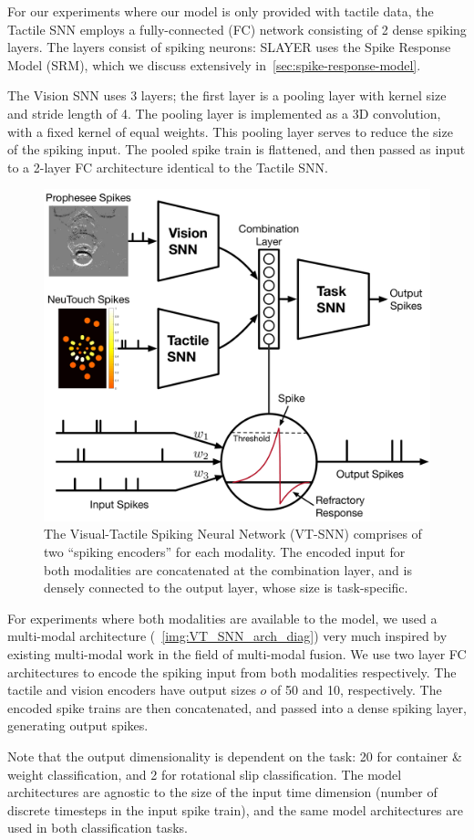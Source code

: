 \documentclass[fyp]{socreport}
\begin{document}
For our experiments where our model is only provided with tactile data, the
Tactile SNN employs a fully-connected (FC) network consisting of 2 dense spiking
layers. The layers consist of spiking neurons: SLAYER uses the Spike Response
Model (SRM), which we discuss extensively in~\autoref{sec:spike-response-model}.

The Vision SNN uses 3 layers; the first layer is a pooling layer with kernel
size and stride length of 4. The pooling layer is implemented as a 3D
convolution, with a fixed kernel of equal weights. This pooling layer serves to
reduce the size of the spiking input. The pooled spike train is flattened, and
then passed as input to a 2-layer FC architecture identical to the Tactile SNN.

\begin{figure}
  \centering
  \includegraphics[width=0.45\columnwidth]{images/VT-SNN_v3.pdf}
  \caption{The Visual-Tactile Spiking Neural Network (VT-SNN) comprises of two
    ``spiking encoders'' for each modality. The encoded input for both
    modalities are concatenated at the combination layer, and is densely
    connected to the output layer, whose size is
    task-specific.\label{img:VT_SNN_arch_diag}}
\end{figure}

For experiments where both modalities are available to the model, we used a
multi-modal architecture (~\autoref{img:VT_SNN_arch_diag}) very much inspired by
existing multi-modal work in the field of multi-modal fusion. We use two layer
FC architectures to encode the spiking input from both modalities respectively.
The tactile and vision encoders have output sizes $o$ of 50 and 10,
respectively. The encoded spike trains are then concatenated, and passed into a
dense spiking layer, generating output spikes.

Note that the output dimensionality is dependent on the task: 20 for container \&
weight classification, and 2 for rotational slip classification. The model
architectures are agnostic to the size of the input time dimension (number of
discrete timesteps in the input spike train), and the same model architectures
are used in both classification tasks.
\end{document}
